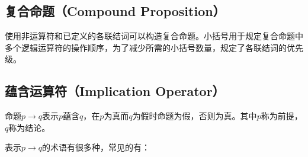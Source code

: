 \documentclass[12pt, openany, oneside]{book}
\begin{document}
\subsection{复合命题（Compound Proposition）}

使用非运算符和已定义的各联结词可以构造复合命题。小括号用于规定复合命题中多个逻辑运算符的操作顺序，为了减少所需的小括号数量，规定了各联结词的优先级。

\begin{table}[H]
	\centering
	\caption{运算符优先级}
\end{table}

\subsection{蕴含运算符（Implication Operator）}

命题$ p \rightarrow q $表示$ p $蕴含$ q $，在$ p $为真而$ q $为假时命题为假，否则为真。其中$ p $称为前提，$ q $称为结论。

\begin{table}[H]
	\centering
	\caption{蕴含真值表}
\end{table}

表示$ p \rightarrow q $的术语有很多种，常见的有：
\end{document}
